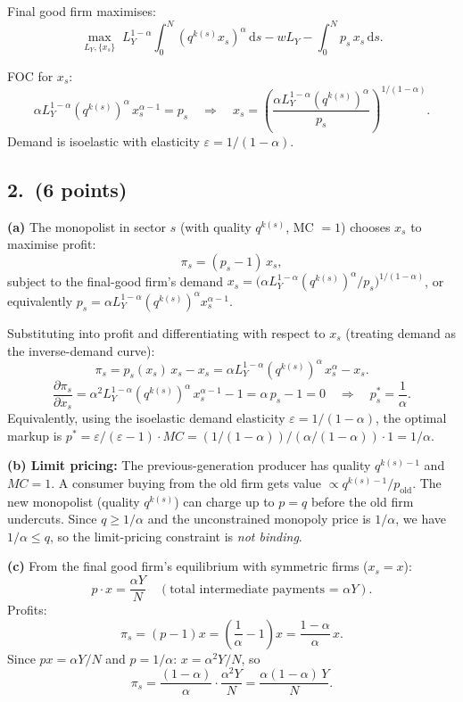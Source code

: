 \documentclass[a4paper,11pt]{article}
\newcommand{\dd}{\mathrm{d}}
\begin{document}
\begin{answerbox}
Final good firm maximises:
\[
    \max_{L_Y,\{x_s\}} \; L_Y^{1-\alpha}\int_0^N (q^{k(s)}x_s)^{\alpha}\,\dd s
    - w L_Y - \int_0^N p_s\,x_s\,\dd s.
\]

FOC for $x_s$:
\[
    \alpha L_Y^{1-\alpha}(q^{k(s)})^{\alpha}\,x_s^{\alpha-1} = p_s
    \quad\Longrightarrow\quad
    \boxed{x_s = \left(\frac{\alpha L_Y^{1-\alpha}(q^{k(s)})^{\alpha}}{p_s}\right)^{1/(1-\alpha)}.}
\]
Demand is isoelastic with elasticity $\varepsilon = 1/(1-\alpha)$.
\end{answerbox}

\subsection*{2.\ (6 points)}

\begin{answerbox}
\textbf{(a)} The monopolist in sector $s$ (with quality $q^{k(s)}$, MC $= 1$) chooses
$x_s$ to maximise profit:
\[
    \pi_s = (p_s - 1)\,x_s,
\]
subject to the final-good firm's demand $x_s = \bigl(\alpha L_Y^{1-\alpha}(q^{k(s)})^\alpha
/ p_s\bigr)^{1/(1-\alpha)}$, or equivalently $p_s = \alpha L_Y^{1-\alpha}(q^{k(s)})^\alpha
x_s^{\alpha-1}$.

Substituting into profit and differentiating with respect to $x_s$ (treating demand
as the inverse-demand curve):
\[
    \pi_s = p_s(x_s)\,x_s - x_s
    = \alpha L_Y^{1-\alpha}(q^{k(s)})^{\alpha}\,x_s^{\alpha} - x_s.
\]
\[
    \frac{\partial\pi_s}{\partial x_s}
    = \alpha^2 L_Y^{1-\alpha}(q^{k(s)})^{\alpha}\,x_s^{\alpha-1} - 1
    = \alpha\,p_s - 1 = 0
    \quad\Longrightarrow\quad
    p_s^* = \frac{1}{\alpha}.
\]
Equivalently, using the isoelastic demand elasticity $\varepsilon = 1/(1-\alpha)$, the
optimal markup is $p^* = \varepsilon/(\varepsilon-1)\cdot MC = (1/(1-\alpha))/(\alpha/(1-\alpha))
\cdot 1 = \boxed{1/\alpha}$.

\textbf{(b) Limit pricing:}  The previous-generation producer has quality $q^{k(s)-1}$
and $MC = 1$.  A consumer buying from the old firm gets value $\propto q^{k(s)-1}/p_{\mathrm{old}}$.
The new monopolist (quality $q^{k(s)}$) can charge up to $p = q$ before the old firm
undercuts.  Since $q \geq 1/\alpha$ and the unconstrained monopoly price is $1/\alpha$,
we have $1/\alpha \leq q$, so the limit-pricing constraint is \emph{not binding}.

\textbf{(c)} From the final good firm's equilibrium with symmetric firms ($x_s = x$):
\[
    p\cdot x = \frac{\alpha Y}{N} \quad(\text{total intermediate payments = }\alpha Y).
\]
Profits:
\[
    \pi_s = (p - 1)x = \left(\frac{1}{\alpha}-1\right)x = \frac{1-\alpha}{\alpha}\,x.
\]
Since $px = \alpha Y/N$ and $p = 1/\alpha$:
$x = \alpha^2 Y/N$, so
\[
    \boxed{\pi_s = \frac{(1-\alpha)}{\alpha}\cdot\frac{\alpha^2 Y}{N}
    = \frac{\alpha(1-\alpha)\,Y}{N}.}
\]
\end{answerbox}
\end{document}
